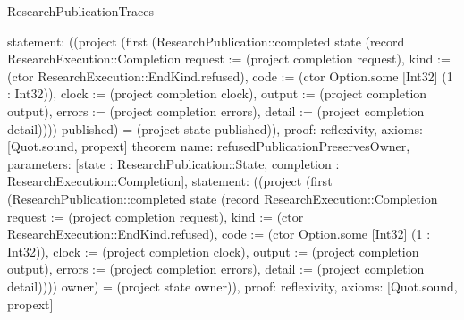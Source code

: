 \begin{lexlean}{ResearchPublicationTraces}
\begin{semanticmodule}
{ statement: ((project (first (ResearchPublication::completed state (record ResearchExecution::Completion {request := (project completion request), kind := (ctor ResearchExecution::EndKind.refused), code := (ctor Option.some [Int32] (1 : Int32)), clock := (project completion clock), output := (project completion output), errors := (project completion errors), detail := (project completion detail)}))) published) = (project state published)),
 proof: reflexivity{},
 axioms: [Quot.sound, propext]
}
theorem{
 name: refusedPublicationPreservesOwner,
 parameters: [state : ResearchPublication::State, completion : ResearchExecution::Completion],
 statement: ((project (first (ResearchPublication::completed state (record ResearchExecution::Completion {request := (project completion request), kind := (ctor ResearchExecution::EndKind.refused), code := (ctor Option.some [Int32] (1 : Int32)), clock := (project completion clock), output := (project completion output), errors := (project completion errors), detail := (project completion detail)}))) owner) = (project state owner)),
 proof: reflexivity{},
 axioms: [Quot.sound, propext]
}
\end{semanticmodule}
\end{lexlean}

